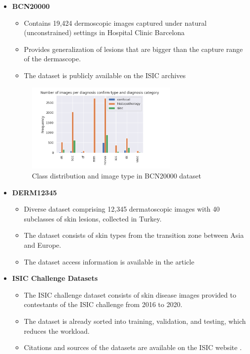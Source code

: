 \documentclass{article} %
\begin{document}
\begin{itemize}
\clearpage

\item \textbf{BCN20000} \citep{combalia2019bcn20000}
\begin{itemize}
\item Contains 19,424 dermoscopic images captured under natural (unconstrained) settings in Hospital Clinic Barcelona
\item Provides generalization of lesions that are bigger than the capture range of the dermascope.
\item The dataset is publicly available on the ISIC archives \citep{isic2025bcn}
\end{itemize}

\begin{figure}[!h]
\begin{center}
\includegraphics[width=0.7\textwidth]{Figs/bcn20000.png}
\end{center}
\caption{Class distribution and image type in BCN20000 dataset \citep{isic2025bcn}}
\end{figure}

\item \textbf{DERM12345} \citep{yilmaz2024derm12345}
\begin{itemize}
\item Diverse dataset comprising 12,345 dermatoscopic images with 40 subclasses of skin lesions, collected in Turkey.
\item The dataset consists of skin types from the transition zone between Asia and Europe.
\item The dataset access information is available in the article \citep{yilmaz2024derm12345}
\end{itemize}

\item \textbf{ISIC Challenge Datasets} \citep{rotemberg2021patient}
\begin{itemize}
\item The ISIC challenge dataset consists of skin disease images provided to contestants of the ISIC challenge from 2016 to 2020.
\item The dataset is already sorted into training, validation, and testing, which reduces the workload.
\item Citations and sources of the datasets are available on the ISIC website \citep{rotemberg2021patient}.
\end{itemize}
\end{itemize}
\end{document}
